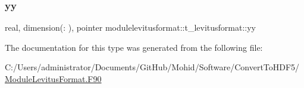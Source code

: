 \subsubsection{\texorpdfstring{yy}{yy}}
{\footnotesize\ttfamily real, dimension(\+:  ), pointer modulelevitusformat\+::t\+\_\+levitusformat\+::yy\hspace{0.3cm}{\ttfamily [private]}}



The documentation for this type was generated from the following file\+:\begin{DoxyCompactItemize}
\item 
C\+:/\+Users/administrator/\+Documents/\+Git\+Hub/\+Mohid/\+Software/\+Convert\+To\+H\+D\+F5/\mbox{\hyperlink{_module_levitus_format_8_f90}{Module\+Levitus\+Format.\+F90}}\end{DoxyCompactItemize}
